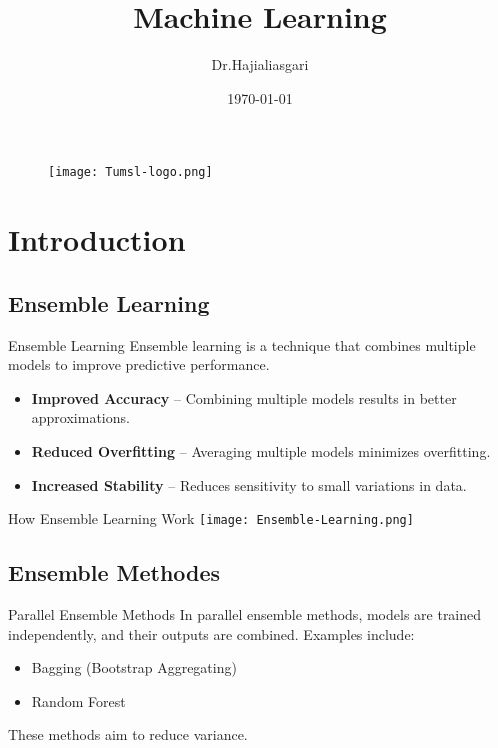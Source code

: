 \documentclass[serif, aspectratio=169]{beamer}
\author{Dr.Hajialiasgari}
\title{Machine Learning}
\institute{
    Tehran University \\
    Of\\
    Medical Science
}
\date{\small \today}
\begin{document}
\begin{frame}
    \titlepage
    \vspace*{-0.6cm}
    \begin{figure}[htpb]
        \begin{center}
            \texttt{[image: Tumsl-logo.png]}
        \end{center}
    \end{figure}
\end{frame}

\begin{frame}    
\tableofcontents[sectionstyle=show, subsectionstyle=show/shaded/hide, subsubsectionstyle=show/shaded/hide]
\end{frame}

\section{Introduction}

\subsection{Ensemble Learning}

\begin{frame}{Ensemble Learning}
    Ensemble learning is a technique that combines multiple models to improve predictive performance.
    \begin{itemize}
        \item \textbf{Improved Accuracy} – Combining multiple models results in better approximations.
        \item \textbf{Reduced Overfitting} – Averaging multiple models minimizes overfitting.
        \item \textbf{Increased Stability} – Reduces sensitivity to small variations in data.
    \end{itemize}
\end{frame}

\begin{frame}{How Ensemble Learning Work}
    \centering
    \texttt{[image: Ensemble-Learning.png]}
\end{frame}

\subsection{Ensemble Methodes}

\begin{frame}{Parallel Ensemble Methods}
    In parallel ensemble methods, models are trained independently, and their outputs are combined.
    Examples include:
    \begin{itemize}
        \item Bagging (Bootstrap Aggregating)
        \item Random Forest
    \end{itemize}
    These methods aim to reduce variance.
\end{frame}
\end{document}
